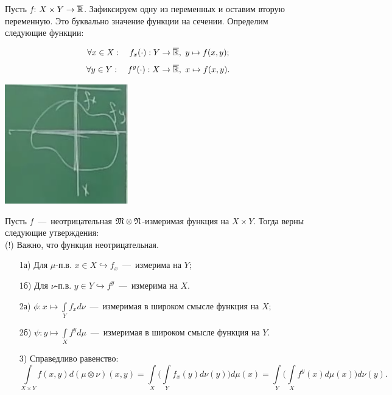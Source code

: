 \begin{definition}
    Пусть $f$: $X \times Y \rightarrow \overline{\mathbb{R}}$. Зафиксируем одну из переменных и оставим вторую переменную. Это буквально значение функции на сечении. Определим следующие функции: 

\begin{minipage}{0.5\textwidth}\raggedleft
    \[\forall x \in X:\quad f_x (\cdot): Y \rightarrow \overline{\mathbb{R}}, \  y \mapsto f(x, y);\]
    \[\forall y \in Y: \quad f^y(\cdot): X \rightarrow \overline{\mathbb{R}}, \ x \mapsto f(x, y).\]
\end{minipage}
    \begin{minipage}{0.5\textwidth}%
    \includegraphics[width=0.4\textwidth]{images/Slice.png}
\end{minipage}%
\hfill%
 

\end{definition}
\begin{theorem}[Тонелли]
    Пусть $f$~---~неотрицательная $\mathfrak{M}\otimes\mathfrak{N}$-измеримая функция на $X \times Y$. Тогда верны следующие утверждения:\\
    (!) Важно, что функция неотрицательная.
    \begin{enumerate}
        \item[1а)] Для $\mu$-п.в. $x \in X \hookrightarrow f_x$~---~измерима на $Y$;
        \item[1б)] Для $\nu$-п.в. $y \in Y \hookrightarrow f^y$~---~измерима на $X$.
        \item[2а)] $\phi: x \mapsto \int\limits_Y f_xd\nu$~---~измеримая в широком смысле функция на $X$;
        \item[2б)] $\psi: y \mapsto \int\limits_X f^yd\mu$~---~измеримая в широком смысле функция на $Y$.
        \item[3)] Справедливо равенство: \[\int\limits_{X \times Y}f(x, y)d(\mu\otimes\nu)(x, y) = \int\limits_X\biggl(\int\limits_Y f_x (y) d\nu (y) \biggr)d\mu(x) = \int\limits_Y\biggl(\int\limits_X f^y(x)d\mu(x)\biggr)d\nu(y).\]
    \end{enumerate}
\end{theorem}
